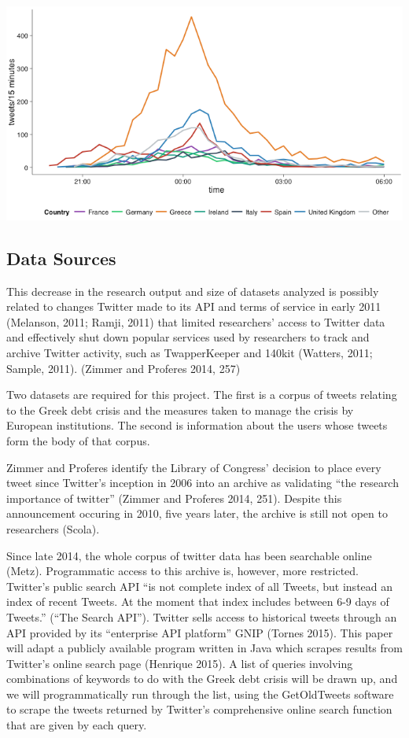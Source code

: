 \documentclass[]{article}
\makeatletter
\def\maxwidth{\ifdim\Gin@nat@width>\linewidth\linewidth
\else\Gin@nat@width\fi}
\let\Oldincludegraphics\includegraphics
\renewcommand{\includegraphics}[1]{\Oldincludegraphics[width=\maxwidth]{#1}}
\makeatother
\begin{document}
\includegraphics{img/Greece-twitter-2.png}

\subsection{Data Sources}\label{data-sources}

This decrease in the research output and size of datasets analyzed is
possibly related to changes Twitter made to its API and terms of service
in early 2011 (Melanson, 2011; Ramji, 2011) that limited researchers'
access to Twitter data and effectively shut down popular services used
by researchers to track and archive Twitter activity, such as
TwapperKeeper and 140kit (Watters, 2011; Sample, 2011). (Zimmer and
Proferes 2014, 257)

Two datasets are required for this project. The first is a corpus of
tweets relating to the Greek debt crisis and the measures taken to
manage the crisis by European institutions. The second is information
about the users whose tweets form the body of that corpus.

Zimmer and Proferes identify the Library of Congress' decision to place
every tweet since Twitter's inception in 2006 into an archive as
validating ``the research importance of twitter'' (Zimmer and Proferes
2014, 251). Despite this announcement occuring in 2010, five years
later, the archive is still not open to researchers (Scola).

Since late 2014, the whole corpus of twitter data has been searchable
online (Metz). Programmatic access to this archive is, however, more
restricted. Twitter's public search API ``is not complete index of all
Tweets, but instead an index of recent Tweets. At the moment that index
includes between 6-9 days of Tweets.'' (``The Search API''). Twitter
sells access to historical tweets through an API provided by its
``enterprise API platform'' GNIP (Tornes 2015). This paper will adapt a
publicly available program written in Java which scrapes results from
Twitter's online search page (Henrique 2015). A list of queries
involving combinations of keywords to do with the Greek debt crisis will
be drawn up, and we will programmatically run through the list, using
the GetOldTweets software to scrape the tweets returned by Twitter's
comprehensive online search function that are given by each query.
\end{document}
